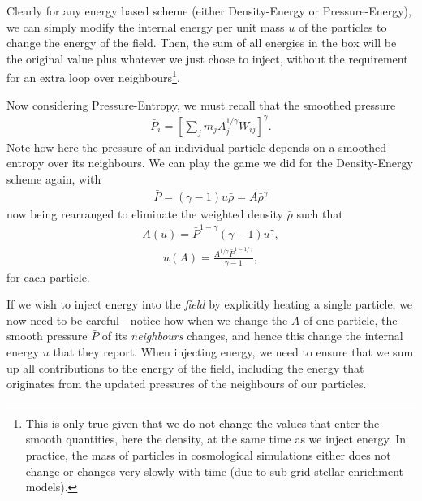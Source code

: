 Clearly for any energy based scheme (either Density-Energy or
Pressure-Energy), we can simply modify the internal energy per unit mass $u$
of the particles to change the energy of the field. Then, the sum of all energies
in the box will be the original value plus whatever we just chose to inject,
without the requirement for an extra loop over neighbours\footnote{This is only
true given that we do not change the values that enter the smooth quantities,
here the density, at the same time as we inject energy. In practice, the mass
of particles in cosmological simulations either does not change or changes
very slowly with time (due to sub-grid stellar enrichment models).}.

Now considering Pressure-Entropy, we must recall that the smoothed pressure
\begin{align}
    \bar{P}_i = \left[\sum_j m_j A_j^{1 / \gamma} W_{ij} \right]^\gamma.
\end{align}
Note how here the pressure of an individual particle depends on a smoothed
entropy over its neighbours. We can play the game we did for the Density-Energy
scheme again, with
\begin{align}
    \bar{P} = (\gamma - 1) u \bar{\rho} = A \bar{\rho}^\gamma
\end{align}
now being rearranged to eliminate the weighted density $\bar{\rho}$ such that
\begin{align}
    A(u) = \bar{P}^{1 - \gamma} ( \gamma - 1) u^\gamma,
\end{align}
\begin{align}
    u(A) = \frac{A^{1/\gamma} \bar{P}^{1 - 1/\gamma}}{\gamma - 1},
\end{align}
for each particle.

If we wish to inject energy into the \emph{field} by explicitly heating a single
particle, we now need to be careful - notice how when we change the $A$ of one particle,
the smooth pressure $\bar{P}$ of its \emph{neighbours} changes, and hence this
change the internal energy $u$ that they report. When injecting energy, we need
to ensure that we sum up all contributions to the energy of the field, including
the energy that originates from the updated pressures of the neighbours of our
particles.

